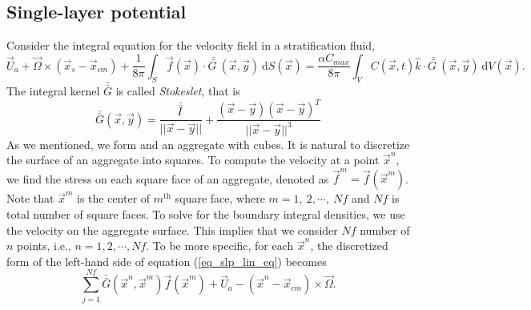 
 \subsection{Single-layer potential}
 Consider the integral equation for the velocity field in a stratification fluid,
 \begin{equation}
	\vec{U}_a + \vec{\Omega} \times (\vec{x}_s - \vec{x}_{cm})
 		  + \frac{1}{8 \pi} \int_{S}
 		 \vec{f}(\vec{x})
 		 \cdot \bar{\bar{G \ }} (\vec{x},\vec{y})
 		 \ \textrm{d}S(\vec{x})
 		=
		  \frac{ \alpha  C_{max}}{8\pi } \int_{V}
 		C(\vec{x}, t ) \hat{k} \cdot
 		\bar{\bar{G \ }} (\vec{x}, \vec{y})
 		\  \textrm{d}V(\vec{x}).
 \label{eq_slp_lin_eq}
 \end{equation}
 The integral kernel $\bar{\bar{G }} $ is called \textit{Stokeslet}, that is 
 \begin{equation}
 	\bar{\bar{G}}( \vec{x}, \vec{y}) = 
 	\frac{\bar{\bar{I \ }}}{||\vec{x}-\vec{y}||} + \frac{(\vec{x}-\vec{y})(\vec{x}-\vec{y})^T}{||\vec{x}-\vec{y}||^3}
 \end{equation}
As we mentioned, we form and an aggregate with cubes. It is natural to discretize the surface of an aggregate into squares. 
To compute the velocity at a point $\vec{x}^n$, we find the stress on each square face of an aggregate, denoted as $\vec{f}^m = \vec{f}(\vec{x}^m)$. Note that $\vec{x}^m$ is the center of $m^{\text{th}}$ square face, where $m = 1, \ 2, \cdots, \ Nf$ and $Nf$ is total number of square faces.
To solve for the boundary integral densities, we use the velocity on the aggregate surface. This implies that we consider $Nf$ number of $n$ points, i.e., $n = 1,2, \cdots, Nf$. To be more specific, for each $\vec{x}^n$, the discretized form of the left-hand side of equation (\ref{eq_slp_lin_eq}) becomes
\begin{equation}
\sum_{j = 1}^{Nf}
	 \bar{\bar{G}}(\vec{x}^n,  \vec{x}^m)  \vec{f}(\vec{x}^m)
	+ \vec{U}_a - 
	(\vec{x}^n - \vec{x}_{cm}) \times \vec{\Omega}.
\end{equation}
